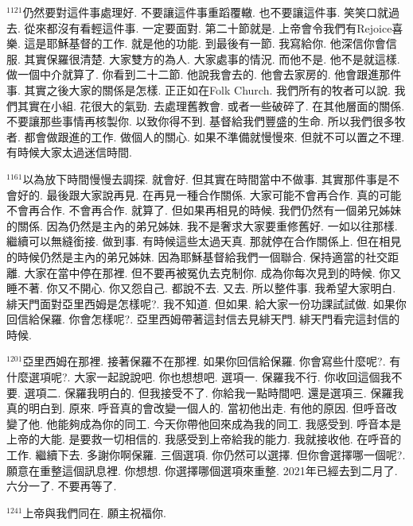 \documentclass{book}
\begin{document}
$^{1121}$仍然要對這件事處理好.
不要讓這件事重蹈覆轍.
也不要讓這件事.
笑笑口就過去.
從來都沒有看輕這件事.
一定要面對.
第二十節就是.
上帝會令我們有Rejoice喜樂.
這是耶穌基督的工作.
就是他的功能.
到最後有一節.
我寫給你.
他深信你會信服.
其實保羅很清楚.
大家雙方的為人.
大家處事的情況.
而他不是.
他不是就這樣.
做一個中介就算了.
你看到二十二節.
他說我會去的.
他會去家房的.
他會跟進那件事.
其實之後大家的關係是怎樣.
正正如在Folk Church.
我們所有的牧者可以說.
我們其實在小組.
花很大的氣勁.
去處理舊教會.
或者一些破碎了.
在其他層面的關係.
不要讓那些事情再核製你.
以致你得不到.
基督給我們豐盛的生命.
所以我們很多牧者.
都會做跟進的工作.
做個人的關心.
如果不準備就慢慢來.
但就不可以置之不理.
有時候大家太過迷信時間.

$^{1161}$以為放下時間慢慢去調探.
就會好.
但其實在時間當中不做事.
其實那件事是不會好的.
最後跟大家說再見.
在再見一種合作關係.
大家可能不會再合作.
真的可能不會再合作.
不會再合作.
就算了.
但如果再相見的時候.
我們仍然有一個弟兄姊妹的關係.
因為仍然是主內的弟兄姊妹.
我不是奢求大家要重修舊好.
一如以往那樣.
繼續可以無縫銜接.
做到事.
有時候這些太過天真.
那就停在合作關係上.
但在相見的時候仍然是主內的弟兄姊妹.
因為耶穌基督給我們一個聯合.
保持適當的社交距離.
大家在當中停在那裡.
但不要再被冤仇去克制你.
成為你每次見到的時候.
你又睡不著.
你又不開心.
你又怨自己.
都說不去.
又去.
所以整件事.
我希望大家明白.
緋天門面對亞里西姆是怎樣呢?.
我不知道.
但如果.
給大家一份功課試試做.
如果你回信給保羅.
你會怎樣呢?.
亞里西姆帶著這封信去見緋天門.
緋天門看完這封信的時候.

$^{1201}$亞里西姆在那裡.
接著保羅不在那裡.
如果你回信給保羅.
你會寫些什麼呢?.
有什麼選項呢?.
大家一起說說吧.
你也想想吧.
選項一.
保羅我不行.
你收回這個我不要.
選項二.
保羅我明白的.
但我接受不了.
你給我一點時間吧.
還是選項三.
保羅我真的明白到.
原來.
呼音真的會改變一個人的.
當初他出走.
有他的原因.
但呼音改變了他.
他能夠成為你的同工.
今天你帶他回來成為我的同工.
我感受到.
呼音本是上帝的大能.
是要救一切相信的.
我感受到上帝給我的能力.
我就接收他.
在呼音的工作.
繼續下去.
多謝你啊保羅.
三個選項.
你仍然可以選擇.
但你會選擇哪一個呢?.
願意在重整這個訊息裡.
你想想.
你選擇哪個選項來重整.
2021年已經去到二月了.
六分一了.
不要再等了.

$^{1241}$上帝與我們同在.
願主祝福你.
\newpage
\end{document}
